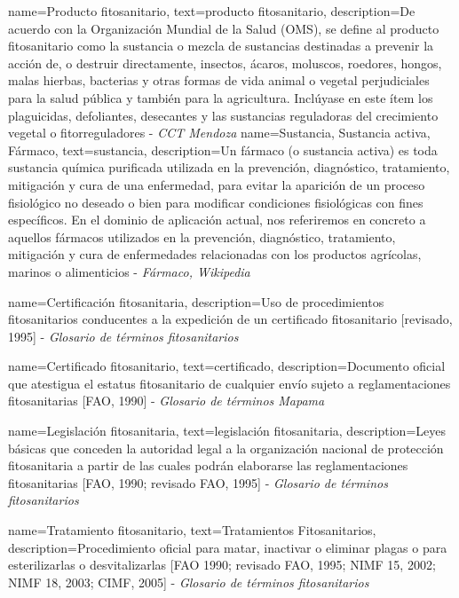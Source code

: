 {
    name={Producto fitosanitario},
    text={producto fitosanitario},
    description={De acuerdo con la Organización Mundial de la Salud (OMS), se define al producto fitosanitario como la \gls{sustancia} o mezcla de sustancias destinadas a prevenir la acción de, o destruir directamente, insectos, ácaros, moluscos, roedores, hongos, malas hierbas, bacterias y otras formas de vida animal o vegetal perjudiciales para la salud pública y también para la agricultura. Inclúyase en este ítem los plaguicidas, defoliantes, desecantes y las sustancias reguladoras del crecimiento vegetal o fitorreguladores - \textit{CCT Mendoza} \cite{cricyt}}
}
{
    name={Sustancia, Sustancia activa, Fármaco},
    text={sustancia},
    description={Un fármaco (o sustancia activa) es toda sustancia química purificada utilizada en la prevención, diagnóstico, tratamiento, mitigación y cura de una enfermedad, para evitar la aparición de un proceso fisiológico no deseado o bien para modificar condiciones fisiológicas con fines específicos. En el dominio de aplicación actual, nos referiremos en concreto a aquellos fármacos utilizados en la prevención, diagnóstico, tratamiento, mitigación y cura de enfermedades relacionadas con los productos agrícolas, marinos o alimenticios - \textit{Fármaco, Wikipedia} \cite{farmacowiki}}
}

{
    name={Certificación fitosanitaria},
    description={Uso de procedimientos fitosanitarios conducentes a la expedición de un certificado fitosanitario [revisado, 1995] - \textit{Glosario de términos fitosanitarios} \cite{glosarioterminosfito}}
}

{
    name={Certificado fitosanitario},
    text={certificado},
    description={Documento oficial que atestigua el estatus fitosanitario de cualquier envío sujeto a reglamentaciones fitosanitarias [FAO, 1990] - \textit{Glosario de términos Mapama} \cite{glosarioterminosmapama}}
}

{
    name={Legislación fitosanitaria},
    text={legislación fitosanitaria},
    description={Leyes básicas que conceden la autoridad legal a la organización nacional de protección fitosanitaria a partir de las cuales podrán elaborarse las reglamentaciones fitosanitarias [FAO, 1990; revisado FAO, 1995] - \textit{Glosario de términos fitosanitarios} \cite{glosarioterminosfito}}
}

{
    name={Tratamiento fitosanitario},
    text={Tratamientos Fitosanitarios},
    description={Procedimiento oficial para matar, inactivar o eliminar plagas o para esterilizarlas o desvitalizarlas [FAO 1990; revisado FAO, 1995; NIMF 15, 2002; NIMF 18, 2003; CIMF, 2005] - \textit{Glosario de términos fitosanitarios} \cite{glosarioterminosfito}}
}




